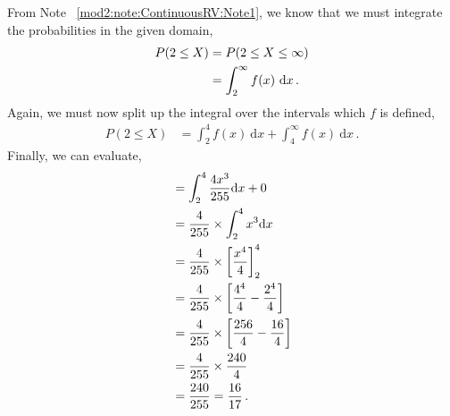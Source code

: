 \begin{subquestions}
\begin{subsubquestions}
	
\subsubquestion

From Note ~\ref{mod2:note:ContinuousRV:Note1}, we know that we must integrate the probabilities in the given domain,
\begin{align}
	P(2 \leq X) &= P(2\leq X \leq \infty) \nonumber \\
	           & = \int_2^{\infty} f(x)~\mathrm{d}x \,.
\end{align}
Again, we must now split up the integral over the intervals which $f$ is defined,
\begin{align}
	P(2 \leq X)  & = \int_2^{4} f(x)~\mathrm{d}x+\int_4^{\infty} f(x)~\mathrm{d}x \,.
\end{align}
Finally, we can evaluate,
\begin{align}
                                    & = \int_{2}^{4} \frac{4x^3}{255} \mathrm{d}x + 0 \nonumber \\
	                                 & = \frac{4}{255} \times \int_2^4 x^3\mathrm{d}x \nonumber \\
	                                 & = \frac{4}{255} \times \left[\frac{x^4}{4}\right]^4_2 \nonumber \\
	                                 & = \frac{4}{255} \times \left[\frac{4^4}{4}-\frac{2^4}{4}\right] \nonumber \\
	                                 & = \frac{4}{255} \times \left[\frac{256}{4}-\frac{16}{4}\right] \nonumber \\
	                                 & = \frac{4}{255} \times \frac{240}{4} \nonumber \\
	                                 & = \frac{240}{255} = \frac{16}{17} \,.
\end{align}
	

\subsubquestion


\end{subsubquestions}
\end{subquestions}
